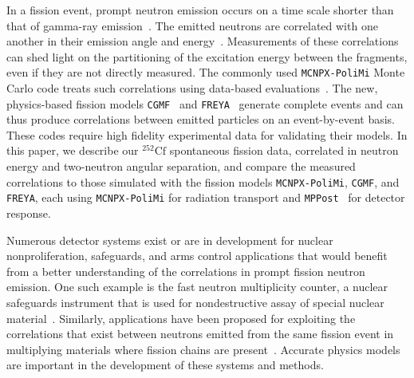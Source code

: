 \documentclass[preprint,12pt]{elsarticle}
\newcommand{\MPPost}          {\texttt{MPPost}\xspace}
\newcommand{\mcnpxpolimi}     {\texttt{MCNPX-PoliMi}\xspace}
\newcommand{\cgmf}            {\texttt{CGMF}\xspace}
\newcommand{\freya}           {\texttt{FREYA}\xspace}
\newcommand{\Cftft}{\ensuremath{^{252}\text{Cf}}\xspace}
\begin{document}
In a fission event, prompt neutron emission occurs on a time scale shorter than that of gamma-ray emission~\cite{Fraser1952a,Skarsvag1970}. The emitted neutrons are correlated with one another in their emission angle and energy~\cite{Bowman1962,Larsen2014}. Measurements of these correlations can shed light on the partitioning of the excitation energy between the fragments, even if they are not directly measured. The commonly used \mcnpxpolimi Monte Carlo code treats such correlations using data-based evaluations~\cite{Pozzi2012}. The new, physics-based fission models \cgmf~\cite{Talou2013,Talou2014,Talou2016} and \freya~\cite{Randrup2009,Vogt2011,Vogt2013,Vogt2014,Randrup2014,Vogt2017,Verbeke2018} generate complete events and can thus produce correlations between emitted particles on an event-by-event basis. These codes require high fidelity experimental data for validating their models. In this paper, we describe our \Cftft spontaneous fission data, correlated in neutron energy and two-neutron angular separation, and compare the measured correlations to those simulated with the fission models \mcnpxpolimi, \cgmf, and \freya, each using \mcnpxpolimi for radiation transport and \MPPost~\cite{Miller2012} for detector response.

Numerous detector systems exist or are in development for nuclear nonproliferation, safeguards, and arms control applications that would benefit from a better understanding of the correlations in prompt fission neutron emission. One such example is the fast neutron multiplicity counter, a nuclear safeguards instrument that is used for nondestructive assay of special nuclear material~\cite{Frame2007,DiFulvio2017}. 
Similarly, applications have been proposed for exploiting the correlations that exist between neutrons emitted from the same fission event in multiplying materials where fission chains are present~\cite{Mueller2016,Holewa2013}. 
Accurate physics models are important in the development of these systems and methods.
\end{document}
